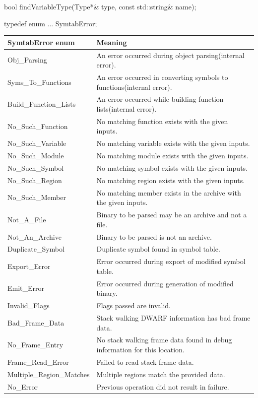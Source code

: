 \begin{apient}
bool findVariableType(Type*& type,
                      const std::string& name);
\end{apient}

\begin{apient}
typedef enum ... SymtabError;
\end{apient}

\begin{center}
\begin{tabular}{ll}
\toprule
SymtabError enum& Meaning\\
\midrule
Obj\_Parsing & An error occurred during object parsing(internal error).\\
Syms\_To\_Functions & An error occurred in converting symbols to functions(internal error).\\
Build\_Function\_Lists & An error occurred while building function lists(internal error).\\
No\_Such\_Function & No matching function exists with the given inputs.\\
No\_Such\_Variable & No matching variable exists with the given inputs.\\
No\_Such\_Module & No matching module exists with the given inputs.\\
No\_Such\_Symbol & No matching symbol exists with the given inputs.\\
No\_Such\_Region & No matching region exists with the given inputs.\\
No\_Such\_Member & No matching member exists in the archive with the given inputs.\\
Not\_A\_File & Binary to be parsed may be an archive and not a file.\\
Not\_An\_Archive & Binary to be parsed is not an archive.\\
Duplicate\_Symbol & Duplicate symbol found in symbol table.\\
Export\_Error & Error occurred during export of modified symbol table. \\
Emit\_Error & Error occurred during generation of modified binary. \\
Invalid\_Flags & Flags passed are invalid.\\
Bad\_Frame\_Data & Stack walking DWARF information has bad frame data.\\
No\_Frame\_Entry & No stack walking frame data found in debug information for this location.\\
Frame\_Read\_Error & Failed to read stack frame data.\\
Multiple\_Region\_Matches & Multiple regions match the provided data. \\
No\_Error & Previous operation did not result in failure.\\
\bottomrule
\end{tabular}
\end{center}

